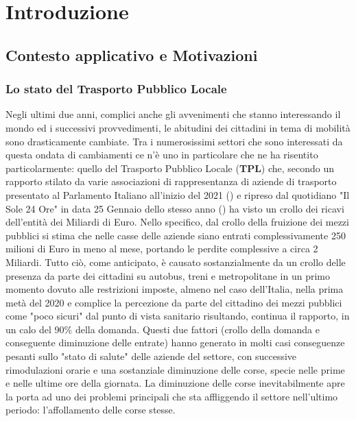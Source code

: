 \chapter{Introduzione}

\section{Contesto applicativo e Motivazioni} %
    \subsection{Lo stato del Trasporto Pubblico Locale}
    Negli ultimi due anni, complici anche gli avvenimenti che stanno interessando il mondo ed i successivi provvedimenti, le abitudini dei cittadini in tema di mobilità sono drasticamente cambiate.
    Tra i numerosissimi settori che sono interessati da questa ondata di cambiamenti ce n'è uno in particolare che ne ha risentito particolarmente: quello del Trasporto Pubblico Locale (\textbf{TPL}) che, secondo un rapporto stilato da varie associazioni di rappresentanza di aziende di trasporto presentato al Parlamento Italiano all'inizio del 2021 (\cite{statotpl}) e ripreso dal quotidiano "Il Sole 24 Ore" in data 25 Gennaio dello stesso anno (\cite{statotplsole24ore}) ha visto un crollo dei ricavi dell'entità dei Miliardi di Euro. Nello specifico, dal crollo della fruizione dei mezzi pubblici si stima che nelle casse delle aziende siano entrati complessivamente 250 milioni di Euro in meno al mese, portando le perdite complessive a circa 2 Miliardi.
    Tutto ciò, come anticipato, è causato sostanzialmente da un crollo delle presenza da parte dei cittadini su autobus, treni e metropolitane in un primo momento dovuto alle restrizioni imposte, almeno nel caso dell'Italia, nella prima metà del 2020 e complice la percezione da parte del cittadino dei mezzi pubblici come "poco sicuri" dal punto di vista sanitario risultando, continua il rapporto, in un calo del 90\% della domanda.
    Questi due fattori (crollo della domanda e conseguente diminuzione delle entrate) hanno generato in molti casi conseguenze pesanti sullo "stato di salute" delle aziende del settore, con successive rimodulazioni orarie e una sostanziale diminuzione delle corse, specie nelle prime e nelle ultime ore della giornata. La diminuzione delle corse inevitabilmente apre la porta ad uno dei problemi principali che sta affliggendo il settore nell'ultimo periodo: l'affollamento delle corse stesse.
    
